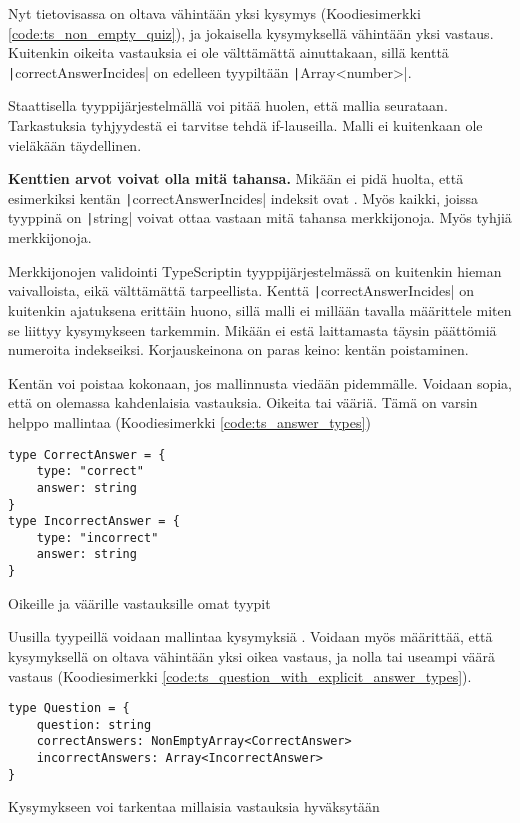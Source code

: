 Nyt tietovisassa on oltava vähintään yksi kysymys (Koodiesimerkki \ref{code:ts_non_empty_quiz}), ja jokaisella kysymyksellä vähintään yksi vastaus. Kuitenkin oikeita vastauksia ei ole välttämättä ainuttakaan, sillä kenttä \texttt|correctAnswerIncides| on edelleen tyypiltään \texttt|Array<number>|.

Staattisella tyyppijärjestelmällä voi pitää huolen, että mallia seurataan. Tarkastuksia tyhjyydestä ei tarvitse tehdä if-lauseilla. Malli ei kuitenkaan ole vieläkään täydellinen.

\textbf{Kenttien arvot voivat olla mitä tahansa.} Mikään ei pidä huolta, että esimerkiksi kentän \texttt|correctAnswerIncides| indeksit ovat . Myös kaikki, joissa tyyppinä on \texttt|string| voivat ottaa vastaan mitä tahansa merkkijonoja. Myös tyhjiä merkkijonoja.

Merkkijonojen validointi TypeScriptin tyyppijärjestelmässä on kuitenkin hieman vaivalloista, eikä välttämättä tarpeellista. Kenttä \texttt|correctAnswerIncides| on kuitenkin ajatuksena erittäin huono, sillä malli ei millään tavalla määrittele miten se liittyy kysymykseen tarkemmin. Mikään ei estä laittamasta täysin päättömiä numeroita  indekseiksi. Korjauskeinona on paras keino: kentän poistaminen.

Kentän voi poistaa kokonaan, jos mallinnusta viedään pidemmälle. Voidaan sopia, että on olemassa kahdenlaisia vastauksia. Oikeita tai vääriä. Tämä on varsin helppo mallintaa (Koodiesimerkki \ref{code:ts_answer_types})

\begin{code}
    \begin{verbatim}
type CorrectAnswer = {
    type: "correct"
    answer: string
}
type IncorrectAnswer = {
    type: "incorrect"
    answer: string
}
    \end{verbatim}
    \caption{Oikeille ja väärille vastauksille omat tyypit}
    \label{code:ts_answer_types}
\end{code}

Uusilla tyypeillä voidaan mallintaa kysymyksiä . Voidaan myös määrittää, että kysymyksellä on oltava vähintään yksi oikea vastaus, ja nolla tai useampi väärä vastaus (Koodiesimerkki \ref{code:ts_question_with_explicit_answer_types}).

\begin{code}
    \begin{verbatim}
type Question = {
    question: string
    correctAnswers: NonEmptyArray<CorrectAnswer>
    incorrectAnswers: Array<IncorrectAnswer>
}
    \end{verbatim}
    \caption{Kysymykseen voi tarkentaa millaisia vastauksia hyväksytään}
    \label{code:ts_question_with_explicit_answer_types}
\end{code}

